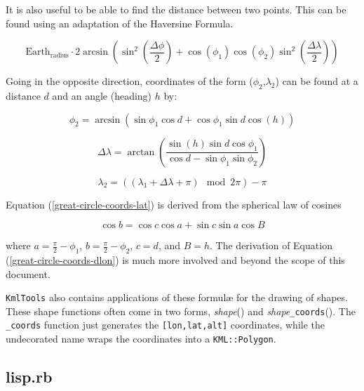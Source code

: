 \documentclass[12pt]{article}
\begin{document}
It is also useful to be able to find the distance between two points.  This can be found using an adaptation of the Haversine Formula.

\begin{equation}
\text{Earth}_\text{radius}\cdot 2\arcsin\left(\sin^2{\left(\frac{\Delta \phi}{2}\right)} + \cos(\phi_1)\cos(\phi_2)\sin^2\left(\frac{\Delta \lambda}{2}\right)\right)
\end{equation}

Going in the opposite direction, coordinates of the form ($\phi_2$,$\lambda_2$) can be found at a distance $d$ and an angle (heading) $h$ by:


\begin{equation}
\label{great-circle-coords-lat}
\phi_2 = \arcsin(\sin\phi_1\cos{d}+\cos\phi_1\sin d\cos(h))
\end{equation}

\begin{equation}
\label{great-circle-coords-dlon}
\Delta\lambda = \arctan\left(\frac{\sin(h)\sin d\cos\phi_1}{\cos d-\sin\phi_1\sin\phi_2}\right)
\end{equation}

\begin{equation}
\lambda_2 = \left((\lambda_1+\Delta\lambda+\pi) \mod 2\pi\right)-\pi
\end{equation}

Equation (\ref{great-circle-coords-lat}) is derived from the spherical law of cosines

\begin{equation}
\cos{b} =\cos{c}\cos{a} + \sin c\sin a\cos B
\end{equation}

where $a=\frac{\pi}{2}-\phi_1$, $b=\frac{\pi}{2}-\phi_2$, $c=d$, and $B=h$.  The derivation of Equation (\ref{great-circle-coords-dlon}) is much more involved and beyond the scope of this document.

\texttt{KmlTools} also contains applications of these formul\ae{} for the drawing of shapes.  These shape functions often come in two forms, \textit{shape}() and \textit{shape}\texttt{\_coords}().  The \texttt{\_coords} function just generates the \texttt{[lon,lat,alt]} coordinates, while the undecorated name wraps the coordinates into a \texttt{KML::Polygon}.

\subsection*{lisp.rb}
\end{document}
